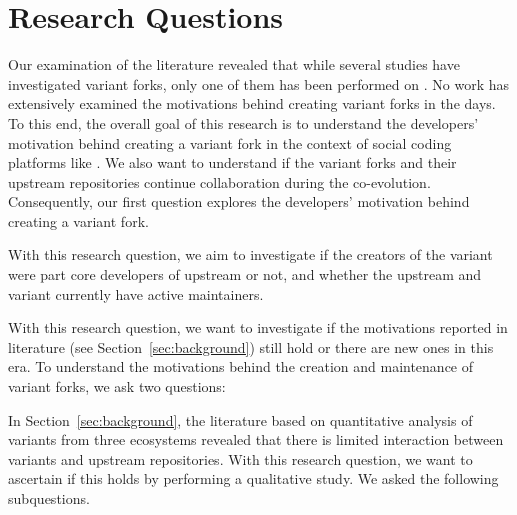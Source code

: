 \section{Research Questions}
\label{sec:rqs}

Our examination of the literature revealed that while several
studies have investigated variant forks, only one of them has been performed on \gh.
No work has extensively examined the motivations behind creating variant forks in the \gh days.
To this end, the overall goal of this research is to understand the developers' motivation behind creating a variant fork in the context of social coding platforms like \gh. We also want to understand if the variant forks and their upstream repositories continue collaboration during the co-evolution. 
Consequently, our first question explores the developers' motivation behind creating a variant fork.

\nd  \textbf{\rqOne} With this research question, we aim to investigate if the creators of the variant were part core developers of upstream or not, and whether the upstream and variant currently have active maintainers.

\nd  \emph{\rqOneOne}

\nd \emph{\rqOneTwo}

\nd \textbf{\rqTwo} With this research question, we want to investigate if the motivations reported in literature (see Section~\ref{sec:background}) still hold or there are new ones in this \gh era.
To understand the motivations behind the creation and maintenance of variant forks, we ask two questions:

\nd \emph{\rqTwoOne} 

\nd  \emph{\rqTwoTwo} 

\nd  \emph{\rqTwoThree}

\nd \textbf{\rqThree} In Section~\ref{sec:background}, the literature based on quantitative analysis of variants from three ecosystems revealed that there is limited interaction between variants and upstream repositories. With this research question, we want to ascertain if this holds by performing a qualitative study. We asked the following subquestions.

\nd \textit{\rqThreeOne}

\nd \textit{\rqThreeTwo}

